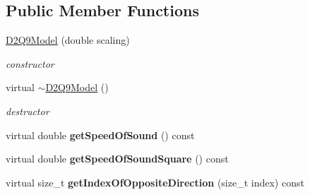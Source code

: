 \subsection*{Public Member Functions}
\begin{DoxyCompactItemize}
\item 
\hypertarget{classnatrium_1_1D2Q9Model_af498c14d311e9172d96b5d962ccc5202}{\hyperlink{classnatrium_1_1D2Q9Model_af498c14d311e9172d96b5d962ccc5202}{D2\-Q9\-Model} (double scaling)}\label{classnatrium_1_1D2Q9Model_af498c14d311e9172d96b5d962ccc5202}

\begin{DoxyCompactList}\small\item\em constructor \end{DoxyCompactList}\item 
\hypertarget{classnatrium_1_1D2Q9Model_aec7d8c160f430e14fbede9ecda368797}{virtual \hyperlink{classnatrium_1_1D2Q9Model_aec7d8c160f430e14fbede9ecda368797}{$\sim$\-D2\-Q9\-Model} ()}\label{classnatrium_1_1D2Q9Model_aec7d8c160f430e14fbede9ecda368797}

\begin{DoxyCompactList}\small\item\em destructor \end{DoxyCompactList}\item 
\hypertarget{classnatrium_1_1D2Q9Model_ac9b53eb73e84ecd13afcf9f3a0b0e195}{virtual double {\bfseries get\-Speed\-Of\-Sound} () const }\label{classnatrium_1_1D2Q9Model_ac9b53eb73e84ecd13afcf9f3a0b0e195}

\item 
\hypertarget{classnatrium_1_1D2Q9Model_aa83e54b682ec7081c298324ee9688a8e}{virtual double {\bfseries get\-Speed\-Of\-Sound\-Square} () const }\label{classnatrium_1_1D2Q9Model_aa83e54b682ec7081c298324ee9688a8e}

\item 
\hypertarget{classnatrium_1_1D2Q9Model_ae29e3df458e24802467ca9c2209cc0ca}{virtual size\-\_\-t {\bfseries get\-Index\-Of\-Opposite\-Direction} (size\-\_\-t index) const }\label{classnatrium_1_1D2Q9Model_ae29e3df458e24802467ca9c2209cc0ca}

\end{DoxyCompactItemize}
